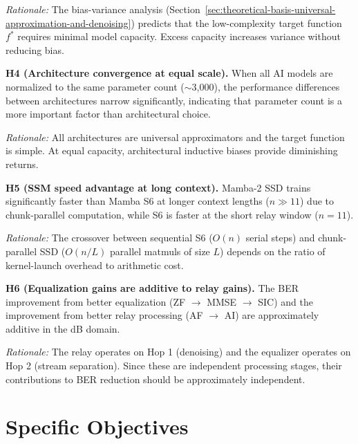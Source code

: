 \emph{Rationale:} The bias-variance analysis (Section~\ref{sec:theoretical-basis-universal-approximation-and-denoising}) predicts that the low-complexity target function \(f^*\) requires minimal model capacity. Excess capacity increases variance without reducing bias.

\textbf{H4 (Architecture convergence at equal scale).} When all AI models are normalized to the same parameter count ($\sim$3,000), the performance differences between architectures narrow significantly, indicating that parameter count is a more important factor than architectural choice.

\emph{Rationale:} All architectures are universal approximators and the target function is simple. At equal capacity, architectural inductive biases provide diminishing returns.

\textbf{H5 (SSM speed advantage at long context).} Mamba-2 SSD trains significantly faster than Mamba S6 at longer context lengths (\(n \gg 11\)) due to chunk-parallel computation, while S6 is faster at the short relay window (\(n = 11\)).

\emph{Rationale:} The crossover between sequential S6 (\(O(n)\) serial steps) and chunk-parallel SSD (\(O(n/L)\) parallel matmuls of size \(L\)) depends on the ratio of kernel-launch overhead to arithmetic cost.

\textbf{H6 (Equalization gains are additive to relay gains).} The BER improvement from better equalization (ZF \(\to\) MMSE \(\to\) SIC) and the improvement from better relay processing (AF \(\to\) AI) are approximately additive in the dB domain.

\emph{Rationale:} The relay operates on Hop 1 (denoising) and the equalizer operates on Hop 2 (stream separation). Since these are independent processing stages, their contributions to BER reduction should be approximately independent.

\section{Specific Objectives}\label{sec:specific-objectives}

